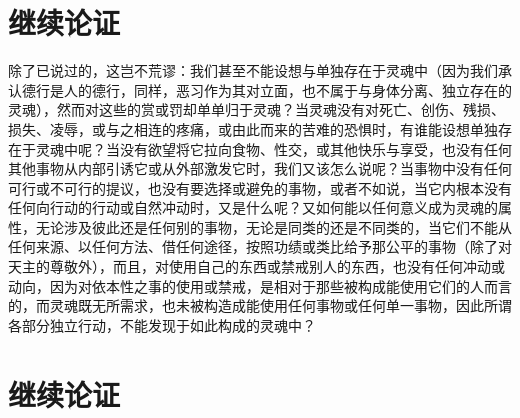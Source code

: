 
\section{继续论证}

除了已说过的，这岂不荒谬：我们甚至不能设想与单独存在于灵魂中（因为我们承认德行是人的德行，同样，恶习作为其对立面，也不属于与身体分离、独立存在的灵魂），然而对这些的赏或罚却单单归于灵魂？当灵魂没有对死亡、创伤、残损、损失、凌辱，或与之相连的疼痛，或由此而来的苦难的恐惧时，有谁能设想单独存在于灵魂中呢？当没有欲望将它拉向食物、性交，或其他快乐与享受，也没有任何其他事物从内部引诱它或从外部激发它时，我们又该怎么说呢？当事物中没有任何可行或不可行的提议，也没有要选择或避免的事物，或者不如说，当它内根本没有任何向行动的行动或自然冲动时，又是什么呢？又如何能以任何意义成为灵魂的属性，无论涉及彼此还是任何别的事物，无论是同类的还是不同类的，当它们不能从任何来源、以任何方法、借任何途径，按照功绩或类比给予那公平的事物（除了对天主的尊敬外），而且，对使用自己的东西或禁戒别人的东西，也没有任何冲动或动向，因为对依本性之事的使用或禁戒，是相对于那些被构成能使用它们的人而言的，而灵魂既无所需求，也未被构造成能使用任何事物或任何单一事物，因此所谓各部分独立行动，不能发现于如此构成的灵魂中？\par


\section{继续论证}

